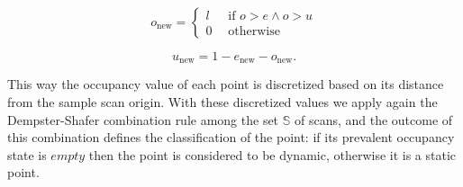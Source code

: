 \begin{equation}
 o_{\text{new}} = \begin{cases}
      l\ \ \ &\mbox{if }o > e \wedge o > u \\
      0 &\mbox{otherwise}
     \end{cases}
\end{equation}

\begin{equation}
 u_{\text{new}} = 1 - e_{\text{new}} - o_{\text{new}}.
\end{equation}

 This way the occupancy value of each point is discretized based on its distance from the sample scan origin. With these discretized values we apply again the Dempster-Shafer combination rule among the set $\mathbb{S}$ of scans, and the outcome of this combination defines the classification of the point: if its prevalent occupancy state is $empty$ then the point is considered to be dynamic, otherwise it is a static point. 
  
 

